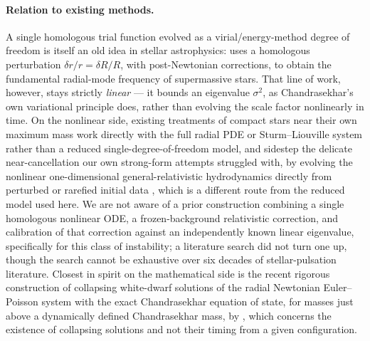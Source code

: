 \documentclass[11pt]{article}
\begin{document}
\paragraph{Relation to existing methods.} A single homologous trial function evolved as a virial/energy-method degree of freedom is itself an old idea in stellar astrophysics: \citet{Fowler1966} uses a homologous perturbation $\delta r/r=\delta R/R$, with post-Newtonian corrections, to obtain the fundamental radial-mode frequency of supermassive stars. That line of work, however, stays strictly \emph{linear} --- it bounds an eigenvalue $\sigma^2$, as Chandrasekhar's own variational principle does, rather than evolving the scale factor nonlinearly in time. On the nonlinear side, existing treatments of compact stars near their own maximum mass work directly with the full radial PDE or Sturm--Liouville system rather than a reduced single-degree-of-freedom model, and sidestep the delicate near-cancellation our own strong-form attempts \citep{OwnbyPhase2} struggled with, by evolving the nonlinear one-dimensional general-relativistic hydrodynamics directly from perturbed or rarefied initial data \citep{BrillanteMishustin2015}, which is a different route from the reduced model used here. We are not aware of a prior construction combining a single homologous nonlinear ODE, a frozen-background relativistic correction, and calibration of that correction against an independently known linear eigenvalue, specifically for this class of instability; a literature search did not turn one up, though the search cannot be exhaustive over six decades of stellar-pulsation literature. Closest in spirit on the mathematical side is the recent rigorous construction of collapsing white-dwarf solutions of the radial Newtonian Euler--Poisson system with the exact Chandrasekhar equation of state, for masses just above a dynamically defined Chandrasekhar mass, by \citet{ChenLin2026}, which concerns the existence of collapsing solutions and not their timing from a given configuration.
\end{document}
